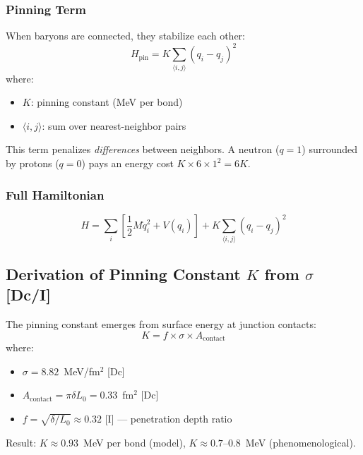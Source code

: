 \subsubsection{Pinning Term}

When baryons are connected, they stabilize each other:
\begin{equation}
    H_{\text{pin}} = K \sum_{\langle i,j \rangle} (q_i - q_j)^2
    \label{eq:m6-pinning}
\end{equation}
where:
\begin{itemize}
    \item $K$: pinning constant (MeV per bond)
    \item $\langle i,j \rangle$: sum over nearest-neighbor pairs
\end{itemize}

This term penalizes \emph{differences} between neighbors. A neutron ($q=1$) surrounded by protons ($q=0$) pays an energy cost $K \times 6 \times 1^2 = 6K$.

\subsubsection{Full Hamiltonian}

\begin{equation}
    H = \sum_i \left[ \frac{1}{2}M\dot{q}_i^2 + V(q_i) \right] + K \sum_{\langle i,j \rangle} (q_i - q_j)^2
    \label{eq:m6-full-hamiltonian}
\end{equation}

\subsection{Derivation of Pinning Constant $K$ from $\sigma$ [Dc/I]}
\label{subsec:m6-K-derivation}

\begin{tcolorbox}[colback=green!5!white, colframe=green!75!black, title=Key Result: $K$ from Brane Tension {[Dc/I]}]
The pinning constant emerges from surface energy at junction contacts:
\begin{equation}
    K = f \times \sigma \times A_{\text{contact}}
    \label{eq:m6-K-formula}
\end{equation}
where:
\begin{itemize}
    \item $\sigma = 8.82$~MeV/fm$^2$ [Dc]
    \item $A_{\text{contact}} = \pi \delta L_0 = 0.33$~fm$^2$ [Dc]
    \item $f = \sqrt{\delta/L_0} \approx 0.32$ [I] --- penetration depth ratio
\end{itemize}
Result: $K \approx 0.93$~MeV per bond (model), $K \approx 0.7$--$0.8$~MeV (phenomenological).
\end{tcolorbox}

